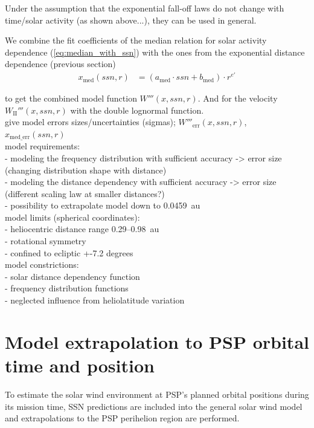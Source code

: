 Under the assumption that the exponential fall-off laws do not change with time/solar activity (as shown above...), they can be used in general.

We combine the fit coefficients of the median relation for solar activity dependence (\ref{eq:median_with_ssn}) with the ones from the exponential distance dependence (previous section)
\begin{align}
	x_\text{med}(ssn,r) &= (a_\text{med} \cdot ssn + b_\text{med}) \cdot r^{e'}
\end{align}

to get the combined model function $W'''(x,ssn,r)$. And for the velocity $W_\text{II}'''(x,ssn,r)$ with the double lognormal function.\\

give model errors sizes/uncertainties (sigmas); $W'''_\text{err}(x,ssn,r)$, $x_\text{med\_err}(ssn,r)$\\

model requirements:\\
- modeling the frequency distribution with sufficient accuracy -> error size (changing distribution shape with distance)\\
- modeling the distance dependency with sufficient accuracy -> error size (different scaling law at smaller distances?)\\
- possibility to extrapolate model down to 0.0459~au\\

model limits (spherical coordinates):\\
- heliocentric distance range 0.29--0.98~au\\
- rotational symmetry\\
- confined to ecliptic +-7.2 degrees\\
model constrictions:\\
- solar distance dependency function\\
- frequency distribution functions\\
- neglected influence from heliolatitude variation\\


\section{Model extrapolation to PSP orbital time and position}
To estimate the solar wind environment at PSP's planned orbital positions during its mission time, SSN predictions are included into the general solar wind model and extrapolations to the PSP perihelion region are performed.\\


